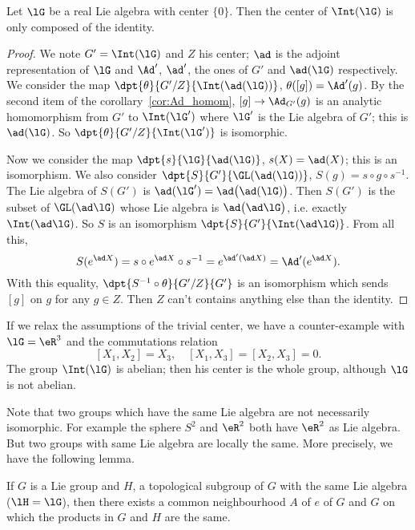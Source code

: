 \begin{corollary}
Let $\lG$ be a real Lie algebra with center $\{0\}$. Then the center of $\Int(\lG)$ is only composed of the identity.
\end{corollary}

\begin{proof}
We note $G'=\Int(\lG)$ and $Z$ his center; $\ad$ is the adjoint representation of $\lG$ and $\Ad'$, $\ad'$, the ones of $G'$ and $\ad(\lG)$ respectively. We consider the map $\dpt{\theta}{G'/Z}{\Int(\ad(\lG))}$, $\theta([g])=\Ad'(g)$. By the second item of the corollary~\ref{cor:Ad_homom}, $[g]\to\Ad_{G'}(g)$ is an analytic homomorphism from $G'$ to $\Int(\lG')$ where $\lG'$ is the Lie algebra of $G'$; this is $\ad(\lG)$. So $\dpt{\theta}{G'/Z}{\Int(\lG')}$ is isomorphic.

Now we consider the map $\dpt{s}{\lG}{\ad(\lG)}$, $s(X)=\ad(X)$; this is an isomorphism. We also consider $\dpt{S}{G'}{ \GL(\ad(\lG))}$, $S(g)=s\circ g\circ s^{-1}$. The Lie algebra of $S(G')$ is $\ad(\lG')=\ad\big(\ad(\lG)\big)$. Then $S(G')$ is the subset of $\GL(\ad\lG)$ whose Lie algebra is $\ad\big(\ad\lG\big)$, i.e. exactly $\Int(\ad\lG)$. So $S$ is an isomorphism $\dpt{S}{G'}{\Int(\ad\lG)}$. From all this,
\begin{equation}
   S(e^{\ad X})=s\circ e^{\ad X}\circ s^{-1}
               =e^{\ad'(\ad X)}
           =\Ad'(e^{\ad X}).
\end{equation}
With this equality, $\dpt{S^{-1}\circ\theta}{G'/Z}{G'}$ is an isomorphism which sends $[g]$ on $g$ for any $g\in Z$. Then $Z$ can't contains anything else than the identity.
\end{proof}

If we relax the assumptions of the trivial center, we have a counter-example with $\lG=\eR^3$ and the commutations relation
\[
   [X_1,X_2]=X_3,\quad [X_1,X_3]=[X_2,X_3]=0.
\]
The group $\Int(\lG)$ is abelian; then his center is the whole group, although $\lG$ is not abelian.

Note that two groups which have the same Lie algebra are not necessarily isomorphic. For example the sphere $S^2$ and $\eR^2$ both have $\eR^2$ as Lie algebra. But two groups with same Lie algebra are locally the same. More precisely, we have the following lemma.

\begin{lemma}
If $G$ is a Lie group and $H$, a topological subgroup of $G$ with the same Lie algebra ($\lH=\lG$), then there exists a common neighbourhood $A$ of $e$ of $G$ and $G$ on which the products in $G$ and $H$ are the same.
\end{lemma}

